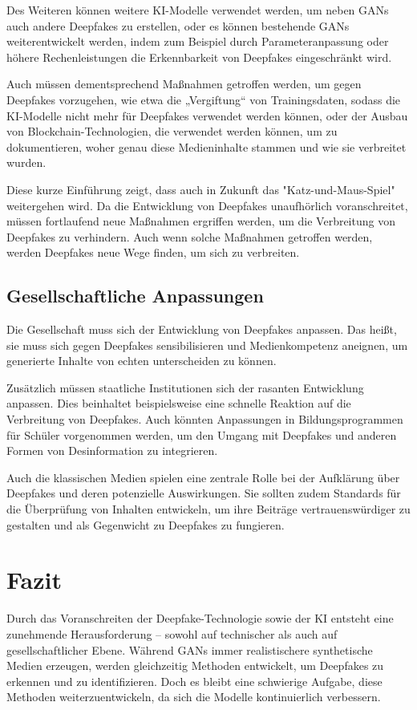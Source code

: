 \documentclass[a4paper,12pt]{article}
\begin{document}
Des Weiteren können weitere KI-Modelle verwendet werden, um neben GANs auch andere Deepfakes zu erstellen, 
oder es können bestehende GANs weiterentwickelt werden, indem zum Beispiel durch Parameteranpassung oder höhere Rechenleistungen die Erkennbarkeit von Deepfakes eingeschränkt wird. \cite{SWP2024}

Auch müssen dementsprechend Maßnahmen getroffen werden, um gegen Deepfakes vorzugehen, wie etwa die „Vergiftung“ von Trainingsdaten, 
sodass die KI-Modelle nicht mehr für Deepfakes verwendet werden können, oder der Ausbau von Blockchain-Technologien, die verwendet werden können, um zu dokumentieren, 
woher genau diese Medieninhalte stammen und wie sie verbreitet wurden. \cite{SWP2024} \cite{KAS2024}

Diese kurze Einführung zeigt, dass auch in Zukunft das "Katz-und-Maus-Spiel" weitergehen wird. 
Da die Entwicklung von Deepfakes unaufhörlich voranschreitet, müssen fortlaufend neue Maßnahmen ergriffen werden, um die Verbreitung von Deepfakes zu verhindern. 
Auch wenn solche Maßnahmen getroffen werden, werden Deepfakes neue Wege finden, um sich zu verbreiten.

\subsection{Gesellschaftliche Anpassungen}
Die Gesellschaft muss sich der Entwicklung von Deepfakes anpassen. 
Das heißt, sie muss sich gegen Deepfakes sensibilisieren und Medienkompetenz aneignen, 
um generierte Inhalte von echten unterscheiden zu können.\cite{KIT2021}\cite{KAS2024}\cite{Fraunhofer2024}

Zusätzlich müssen staatliche Institutionen sich der rasanten Entwicklung anpassen. 
Dies beinhaltet beispielsweise eine schnelle Reaktion auf die Verbreitung von Deepfakes. 
Auch könnten Anpassungen in Bildungsprogrammen für Schüler vorgenommen werden, um den Umgang mit Deepfakes und anderen Formen von Desinformation zu integrieren.\cite{SWP2024}\cite{Fraunhofer2024}

Auch die klassischen Medien spielen eine zentrale Rolle bei der Aufklärung über Deepfakes und deren potenzielle Auswirkungen. 
Sie sollten zudem Standards für die Überprüfung von Inhalten entwickeln, um ihre Beiträge vertrauenswürdiger zu gestalten und als Gegenwicht zu Deepfakes zu fungieren.\cite{SWP2024}\cite{Fraunhofer2024}
\newpage

\section{Fazit}
Durch das Voranschreiten der Deepfake-Technologie sowie der KI entsteht eine zunehmende Herausforderung – sowohl auf technischer als auch auf gesellschaftlicher Ebene. 
Während GANs immer realistischere synthetische Medien erzeugen, werden gleichzeitig Methoden entwickelt, um Deepfakes zu erkennen und zu identifizieren. 
Doch es bleibt eine schwierige Aufgabe, diese Methoden weiterzuentwickeln, da sich die Modelle kontinuierlich verbessern.
\end{document}
